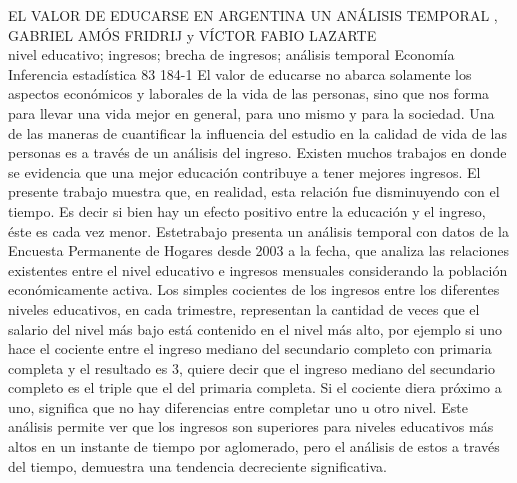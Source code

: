 \A
{EL VALOR DE EDUCARSE EN ARGENTINA UN ANÁLISIS TEMPORAL}
{, GABRIEL AMÓS FRIDRIJ y VÍCTOR FABIO LAZARTE}
{
\\}
{nivel educativo; ingresos; brecha de ingresos; análisis temporal} 
 {Economía} 
 {Inferencia estadística} 
 {83} 
 {184-1}
{El valor de educarse no abarca solamente los aspectos económicos y laborales de la vida de las personas, sino que nos forma para llevar una vida mejor en general, para uno mismo y para la sociedad. Una de las maneras de cuantificar la influencia del estudio en la calidad de vida de las personas es a través de un análisis del ingreso. Existen muchos trabajos en donde se evidencia que una mejor educación contribuye a tener mejores ingresos. El presente trabajo muestra que, en realidad, esta relación fue disminuyendo con el tiempo. Es decir si bien hay un efecto positivo entre la educación y el ingreso, éste es cada vez menor. Estetrabajo presenta un análisis temporal con datos de la Encuesta Permanente de Hogares desde 2003 a la fecha, que analiza las relaciones existentes entre el nivel educativo e ingresos mensuales considerando la población económicamente activa. Los simples cocientes de los ingresos entre los diferentes niveles educativos, en cada trimestre, representan la cantidad de veces que el salario del nivel más bajo está contenido en el nivel más alto, por ejemplo si uno hace el cociente entre el ingreso mediano del secundario completo con primaria completa y el resultado es 3, quiere decir que el ingreso mediano del secundario completo es el triple que el del primaria completa. Si el cociente diera próximo a uno, significa que no hay diferencias entre completar uno u otro nivel. Este análisis permite ver que los ingresos son superiores para niveles educativos más altos en un instante de tiempo por aglomerado, pero el análisis de estos a través del tiempo, demuestra una tendencia decreciente significativa. }
